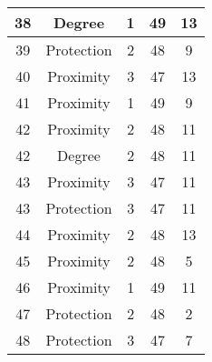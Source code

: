 \documentclass[results.tex]{subfiles}
\begin{document}
\begin{center}
\begin{tabular}{| c || c | c | c | c |}
            \hline
            38                      & Degree                       & 1                      & 49                      & 13                   \\
            \hline
            39                      & Protection                   & 2                      & 48                      & 9                    \\
            \hline
            40                      & Proximity                    & 3                      & 47                      & 13                   \\
            \hline
            41                      & Proximity                    & 1                      & 49                      & 9                    \\
            \hline
            42                      & Proximity                    & 2                      & 48                      & 11                   \\
            \hline
            42                      & Degree                       & 2                      & 48                      & 11                   \\
            \hline
            43                      & Proximity                    & 3                      & 47                      & 11                   \\
            \hline
            43                      & Protection                   & 3                      & 47                      & 11                   \\
            \hline
            44                      & Proximity                    & 2                      & 48                      & 13                   \\
            \hline
            45                      & Proximity                    & 2                      & 48                      & 5                    \\
            \hline
            46                      & Proximity                    & 1                      & 49                      & 11                   \\
            \hline
            47                      & Protection                   & 2                      & 48                      & 2                    \\
            \hline
            48                      & Protection                   & 3                      & 47                      & 7                    \\

\end{tabular}
\end{center}
\end{document}
